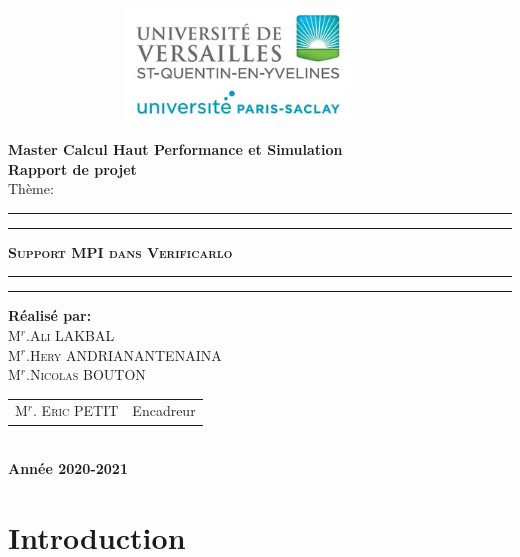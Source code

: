 \documentclass[a4paper,11pt]{report}
\begin{document}
\begin{center}
\begin{figure}[!htbp]
\begin{center}
\includegraphics[width=10cm,height=3cm]{a.jpeg}
\end{center}
\end{figure}


{\Large {\bf { Master Calcul Haut Performance et Simulation }}}\\
 \textbf{\Huge { Rapport de projet}} \\
{\huge {Thème:}}\\
\hrule
\hrule
{}
{\huge \textbf{\textsc{ Support MPI dans Verificarlo}}}\\
\hrule
\hrule
{}
{\textbf{\Large{Réalisé par:}}}\\
{\large\textsc{M$^{r}$.Ali LAKBAL}}\\
{\large\textsc{M$^{r}$.Hery ANDRIANANTENAINA}}\\
{\large\textsc{M$^{r}$.Nicolas BOUTON}}\\
{\large
\begin{tabular}{ll}
M$^{r}$. \textsc{Eric} PETIT  & Encadreur    \\
\end{tabular}
}\\
{\Large\textbf{ Année 2020-2021}}
\end{center}

\tableofcontents

\chapter*{Introduction}
\end{document}
